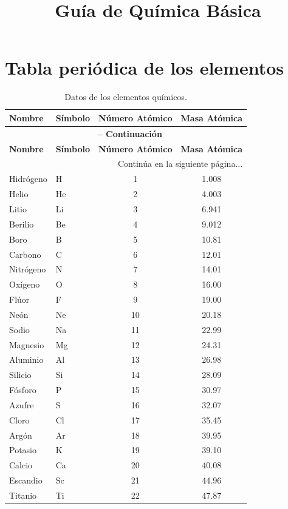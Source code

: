 \documentclass[12pt]{article}
\title{\textbf{Guía de Química Básica}}
\author{}
\date{}
\begin{document}
\maketitle

\section*{Tabla periódica de los elementos}
\begin{longtable}{llcc}
\caption{Datos de los elementos químicos.} \\
\toprule
\textbf{Nombre} & \textbf{Símbolo} & \textbf{Número Atómico} & \textbf{Masa Atómica} \\ 
\midrule
\endfirsthead
\multicolumn{4}{c}{{\bfseries \tablename\ \thetable{} -- Continuación}} \\
\toprule
\textbf{Nombre} & \textbf{Símbolo} & \textbf{Número Atómico} & \textbf{Masa Atómica} \\ 
\midrule
\endhead
\midrule
\multicolumn{4}{r}{{Continúa en la siguiente página...}} \\
\bottomrule
\endfoot
\bottomrule
\endlastfoot
Hidrógeno & H & 1 & 1.008 \\
Helio & He & 2 & 4.003 \\
Litio & Li & 3 & 6.941 \\
Berilio & Be & 4 & 9.012 \\
Boro & B & 5 & 10.81 \\
Carbono & C & 6 & 12.01 \\
Nitrógeno & N & 7 & 14.01 \\
Oxígeno & O & 8 & 16.00 \\
Flúor & F & 9 & 19.00 \\
Neón & Ne & 10 & 20.18 \\
Sodio & Na & 11 & 22.99 \\
Magnesio & Mg & 12 & 24.31 \\
Aluminio & Al & 13 & 26.98 \\
Silicio & Si & 14 & 28.09 \\
Fósforo & P & 15 & 30.97 \\
Azufre & S & 16 & 32.07 \\
Cloro & Cl & 17 & 35.45 \\
Argón & Ar & 18 & 39.95 \\
Potasio & K & 19 & 39.10 \\
Calcio & Ca & 20 & 40.08 \\
Escandio & Sc & 21 & 44.96 \\
Titanio & Ti & 22 & 47.87 \\

\end{longtable}
\end{document}
